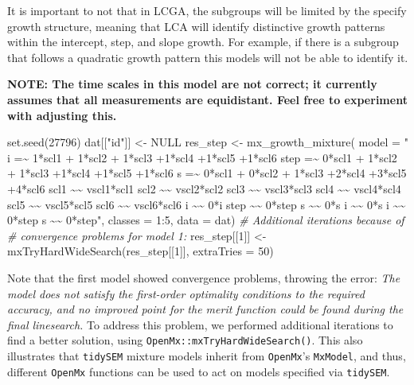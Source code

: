 \documentclass[
  man,floatsintext]{apa6}
\newenvironment{Shaded}{\begin{snugshade}}{\end{snugshade}}
\newcommand{\AttributeTok}[1]{\textcolor[rgb]{0.77,0.63,0.00}{#1}}
\newcommand{\CommentTok}[1]{\textcolor[rgb]{0.56,0.35,0.01}{\textit{#1}}}
\newcommand{\ConstantTok}[1]{\textcolor[rgb]{0.00,0.00,0.00}{#1}}
\newcommand{\DecValTok}[1]{\textcolor[rgb]{0.00,0.00,0.81}{#1}}
\newcommand{\FunctionTok}[1]{\textcolor[rgb]{0.00,0.00,0.00}{#1}}
\newcommand{\NormalTok}[1]{#1}
\newcommand{\OtherTok}[1]{\textcolor[rgb]{0.56,0.35,0.01}{#1}}
\newcommand{\SpecialCharTok}[1]{\textcolor[rgb]{0.00,0.00,0.00}{#1}}
\newcommand{\StringTok}[1]{\textcolor[rgb]{0.31,0.60,0.02}{#1}}
\begin{document}
It is important to not that in LCGA, the subgroups will be limited by
the specify growth structure, meaning that LCA will identify distinctive
growth patterns within the intercept, step, and slope growth. For
example, if there is a subgroup that follows a quadratic growth pattern
this models will not be able to identify it.

\textbf{NOTE: The time scales in this model are not correct; it currently
assumes that all measurements are equidistant. Feel free to experiment
with adjusting this.}

\begin{Shaded}
\begin{Highlighting}[]
\FunctionTok{set.seed}\NormalTok{(}\DecValTok{27796}\NormalTok{)}
\NormalTok{dat[[}\StringTok{"id"}\NormalTok{]] }\OtherTok{\textless{}{-}} \ConstantTok{NULL}
\NormalTok{res\_step }\OtherTok{\textless{}{-}} \FunctionTok{mx\_growth\_mixture}\NormalTok{(}
  \AttributeTok{model =}
  \StringTok{"}
\StringTok{  i =\textasciitilde{} 1*scl1 + 1*scl2 + 1*scl3 +1*scl4 +1*scl5 +1*scl6}
\StringTok{  step =\textasciitilde{} 0*scl1 + 1*scl2 + 1*scl3 +1*scl4 +1*scl5 +1*scl6}
\StringTok{  s =\textasciitilde{} 0*scl1 + 0*scl2 + 1*scl3 +2*scl4 +3*scl5 +4*scl6}
\StringTok{  scl1 \textasciitilde{}\textasciitilde{} vscl1*scl1}
\StringTok{  scl2 \textasciitilde{}\textasciitilde{} vscl2*scl2}
\StringTok{  scl3 \textasciitilde{}\textasciitilde{} vscl3*scl3}
\StringTok{  scl4 \textasciitilde{}\textasciitilde{} vscl4*scl4}
\StringTok{  scl5 \textasciitilde{}\textasciitilde{} vscl5*scl5}
\StringTok{  scl6 \textasciitilde{}\textasciitilde{} vscl6*scl6}
\StringTok{  i \textasciitilde{}\textasciitilde{} 0*i}
\StringTok{  step \textasciitilde{}\textasciitilde{} 0*step}
\StringTok{  s \textasciitilde{}\textasciitilde{} 0*s}
\StringTok{  i \textasciitilde{}\textasciitilde{} 0*s}
\StringTok{  i \textasciitilde{}\textasciitilde{} 0*step}
\StringTok{  s \textasciitilde{}\textasciitilde{} 0*step"}\NormalTok{, }\AttributeTok{classes =} \DecValTok{1}\SpecialCharTok{:}\DecValTok{5}\NormalTok{,}
  \AttributeTok{data =}\NormalTok{ dat)}
\CommentTok{\# Additional iterations because of}
\CommentTok{\# convergence problems for model 1:}
\NormalTok{res\_step[[}\DecValTok{1}\NormalTok{]] }\OtherTok{\textless{}{-}} \FunctionTok{mxTryHardWideSearch}\NormalTok{(res\_step[[}\DecValTok{1}\NormalTok{]], }\AttributeTok{extraTries =} \DecValTok{50}\NormalTok{)}
\end{Highlighting}
\end{Shaded}

Note that the first model showed convergence problems, throwing the
error: \emph{The model does not satisfy the first-order optimality conditions
to the required accuracy, and no improved point for the merit function
could be found during the final linesearch.} To address this problem, we
performed additional iterations to\\
find a better solution, using \texttt{OpenMx::mxTryHardWideSearch()}. This also
illustrates that \texttt{tidySEM} mixture models inherit from \texttt{OpenMx}'s
\texttt{MxModel}, and thus, different \texttt{OpenMx} functions can be used to act on
models specified via \texttt{tidySEM}.
\end{document}
